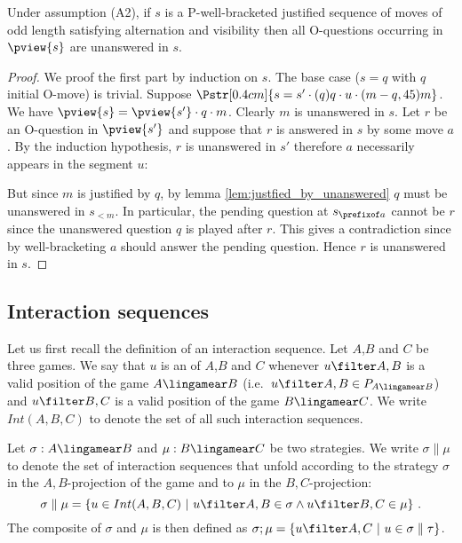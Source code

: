 \begin{lemma}
\label{lem:oq_in_pview_unanswered}
Under assumption (A2), if $s$ is a P-well-bracketed justified sequence of moves of odd length satisfying alternation and visibility then  all O-questions occurring in $\pview{s}$ are unanswered in $s$.
\end{lemma}
\begin{proof}
We proof the first part by induction on $s$.
The base case ($s = q$ with $q$ initial O-move) is trivial.
Suppose $\Pstr[0.4cm]{ s = s' \cdot (q)q \cdot u \cdot (m-q,45){m} }$.
We have $\pview{s} = \pview{s'} \cdot q \cdot m$.
Clearly $m$ is unanswered in $s$. Let $r$ be an O-question in $\pview{s'}$
and suppose that $r$ is answered in $s$ by some move $a$. By the induction hypothesis, $r$ is unanswered in $s'$ therefore $a$ necessarily appears in the segment $u$:

But since $m$ is justified by $q$, by lemma \ref{lem:justfied_by_unanswered} $q$ must be unanswered in $s_{< m}$. In particular, the pending
question at $s_{\prefixof a}$ cannot be $r$ since the unanswered question $q$  is played after $r$. This gives a contradiction since by well-bracketing $a$ should answer the pending question. Hence $r$ is unanswered in $s$.
\end{proof}








\subsection{Interaction sequences} Let us first recall the
definition of an interaction sequence. Let $A$,$B$ and $C$ be three
games. We say that $u$  is an
 of $A$,$B$ and $C$ whenever $u\filter
A,B$ is a valid position of the game $A\lingamear B$ (i.e.~$u\filter
A,B \in P_{A\lingamear B}$) and  $u\filter B,C$ is a valid position
of the game $B\lingamear C$. We write $Int(A,B,C)$ to denote the set
of all such interaction sequences.

Let $\sigma:A\lingamear B$ and $\mu:B\lingamear C$ be two
strategies. We write $\sigma \parallel \mu$ to denote the set of
interaction sequences that unfold according to the strategy $\sigma$
in the $A,B$-projection of the game and to $\mu$ in the
$B,C$-projection:
$$ \sigma \parallel \mu = \{ u \in Int(A,B,C) \ | \ u\filter A,B \in \sigma \wedge u \filter B,C \in \mu \} \ .$$
The composite of $\sigma$ and $\mu$ is then defined as $\sigma ; \mu
= \{ u \filter A,C \ | \ u \in \sigma \parallel \tau \}$.

